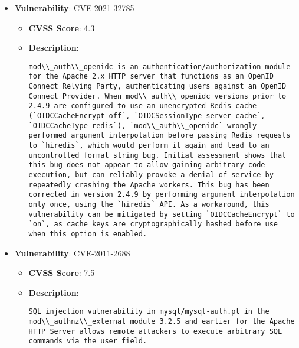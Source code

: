 \documentclass{article}
\begin{document}
\begin{itemize}
        \item \textbf{Vulnerability}: CVE-2021-32785
        \begin{itemize}
            \item \textbf{CVSS Score}:  4.3 
            \item \textbf{Description}:
            \parbox[t]{0.9\linewidth}{
                \verb|mod\\_auth\\_openidc is an authentication/authorization module for the Apache 2.x HTTP server that functions as an OpenID Connect Relying Party, authenticating users against an OpenID Connect Provider. When mod\\_auth\\_openidc versions prior to 2.4.9 are configured to use an unencrypted Redis cache (`OIDCCacheEncrypt off`, `OIDCSessionType server-cache`, `OIDCCacheType redis`), `mod\\_auth\\_openidc` wrongly performed argument interpolation before passing Redis requests to `hiredis`, which would perform it again and lead to an uncontrolled format string bug. Initial assessment shows that this bug does not appear to allow gaining arbitrary code execution, but can reliably provoke a denial of service by repeatedly crashing the Apache workers. This bug has been corrected in version 2.4.9 by performing argument interpolation only once, using the `hiredis` API. As a workaround, this vulnerability can be mitigated by setting `OIDCCacheEncrypt` to `on`, as cache keys are cryptographically hashed before use when this option is enabled.|
            }
        \end{itemize}
    
        \item \textbf{Vulnerability}: CVE-2011-2688
        \begin{itemize}
            \item \textbf{CVSS Score}:  7.5 
            \item \textbf{Description}:
            \parbox[t]{0.9\linewidth}{
                \verb|SQL injection vulnerability in mysql/mysql-auth.pl in the mod\\_authnz\\_external module 3.2.5 and earlier for the Apache HTTP Server allows remote attackers to execute arbitrary SQL commands via the user field.|
            }
        \end{itemize}
    

\end{itemize}
\end{document}
